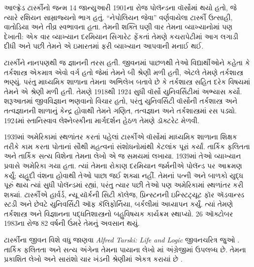 \documentclass[../../../include/open-logic-section]{subfiles}
\begin{document}





આલ્ફ્રેડ ટાર્સ્કીનો જન્મ 14 જાન્યુઆરી
1901ના રોજ પોલૅન્ડના વૉર્સોમાં થયો હતો,
જે ત્યારે રશિયન સામ્રાજ્યનો ભાગ હતું.
“નેપોલિયન જેવા” વર્ણવાયેલા ટાર્સ્કી
ઉત્સાહી, વાતોડિયા અને તીવ્ર સ્વભાવના
હતા. તેમની શક્તિ ઘણી વાર તેમના
વ્યાખ્યાનોમાં પણ દેખાતી: એક વાર
વ્યાખ્યાન દરમિયાન સિગારેટ ફેંકતાં
તેમણે કચરાપેટીમાં આગ લગાડી દીધી
અને પછી તેમને એ ઇમારતમાં
ફરી વ્યાખ્યાન આપવાની મનાઈ થઈ.

ટાર્સ્કીને નાનપણથી જ જ્ઞાનની
તરસ હતી. જીવનમાં પાછળથી
તેઓ વિદ્યાર્થીઓને કહેતા કે
તર્કશાસ્ત્ર એકમાત્ર એવો વર્ગ
હતો જેમાં તેમને બી શ્રેણી
મળી હતી, એટલે તેમણે
તર્કશાસ્ત્ર ભણ્યું. પરંતુ
માધ્યમિક શાળાના તેમના
અભિલેખ બતાવે છે કે
તર્કશાસ્ત્ર સહિત દરેક
વિષયમાં તેમને એ શ્રેણી
મળી હતી. તેમણે 1918થી
1924 સુધી વૉર્સો
યુનિવર્સિટીમાં અભ્યાસ
કર્યો. શરૂઆતમાં જીવવિજ્ઞાન
ભણવાનો વિચાર હતો, પરંતુ
યુનિવર્સિટી વૉર્સોની
તર્કશાસ્ત્ર અને તત્વજ્ઞાનની
શાળાનું કેન્દ્ર હોવાથી
તેમને ગણિત, તત્વજ્ઞાન અને
તર્કશાસ્ત્રમાં રસ પડ્યો.
1924માં સ્તાનિસ્વાવ
લેશ્નેવ્સ્કીના માર્ગદર્શન
હેઠળ તેમણે ડૉક્ટરેટ મેળવી.

1939માં અમેરિકામાં સ્થળાંતર
કરતાં પહેલાં ટાર્સ્કીએ
વૉર્સોમાં માધ્યમિક શાળાના
શિક્ષક તરીકે કામ કરતા
પોતાનાં સૌથી મહત્વનાં સંશોધનોમાંથી
કેટલાંક પૂરાં કર્યાં.
તાર્કિક ફલિતતા અને
તાર્કિક સત્ય વિશેના
તેમના લેખો એ જ સમયમાં
લખાયા. 1939માં તેઓ
વ્યાખ્યાન પ્રવાસે
અમેરિકા ગયા હતા. ત્યાં
તેમના રોકાણ દરમિયાન
જર્મનીએ પોલૅન્ડ પર
આક્રમણ કર્યું; યહૂદી
વંશના હોવાથી તેઓ
પાછા જઈ શક્યા નહીં.
તેમનાં પત્ની અને
બાળકો યુદ્ધ પૂરું થાય
ત્યાં સુધી પોલૅન્ડમાં
રહ્યાં, પરંતુ ત્યાર
પછી તેઓ પણ અમેરિકામાં
સ્થળાંતર કરી શક્યાં.
ટાર્સ્કીએ હાર્વર્ડ,
ન્યૂ યૉર્કની સિટી
કૉલેજ, પ્રિન્સ્ટનની
ઇન્સ્ટિટ્યૂટ ફૉર
ઍડવાન્સ્ડ સ્ટડી
અને છેવટે યુનિવર્સિટી
ઑફ કૅલિફોર્નિયા,
બર્કલીમાં અધ્યાપન
કર્યું. ત્યાં તેમણે
તર્કશાસ્ત્ર અને વિજ્ઞાનના
પદ્ધતિશાસ્ત્રનો બહુવિષયક
કાર્યક્રમ સ્થાપ્યો.
26 ઑક્ટોબર 1983ના
રોજ 82 વર્ષની
ઉંમરે તેમનું અવસાન
થયું.



\begin{reading} 
ટાર્સ્કીના જીવન
વિશે વધુ જાણવા
\emph{Alfred Tarski: Life
  and Logic}
જીવનચરિત્ર જુઓ
\citep{Feferman2004}.
તાર્કિક ફલિતતા અને
સત્ય અંગેના તેમના
પાયાના લેખો
\citep{Tarski1983}માં
અંગ્રેજીમાં ઉપલબ્ધ
છે. તેમના પ્રકાશિત
લેખો અને સારાંશો ચાર
ખંડની શ્રેણીમાં
એકત્ર કરાયાં છે
\citep{Tarski1981}.
\end{reading}
\end{document}

